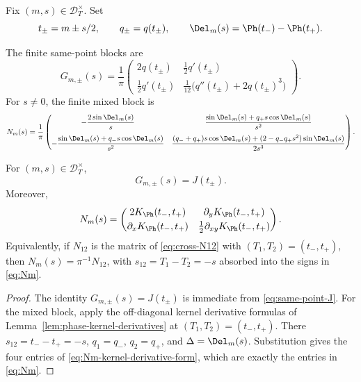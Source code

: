 Fix \((m,s)\in\mathcal D_T^\times\).  Set
\[
        t_\pm=m\pm s/2,
        \qquad q_\pm=q(t_\pm),
        \qquad \Del_m(s)=\Ph(t_-)-\Ph(t_+).
\]

\begin{definition}
\label{def:finite-same-point-and-mixed-blocks}
The finite same-point blocks are
\begin{equation}
\label{eq:Gpm}
G_{m,\pm}(s)
=\frac1\pi
\begin{pmatrix}
2q(t_\pm) & \tfrac12 q'(t_\pm)\\[0.8ex]
\tfrac12 q'(t_\pm) & \tfrac1{12}\bigl(q''(t_\pm)+2q(t_\pm)^3\bigr)
\end{pmatrix}.
\end{equation}
For \(s\ne0\), the finite mixed block is
\begin{equation}
\label{eq:Nm}
N_m(s)
=\frac1\pi
\begin{pmatrix}
-\dfrac{2\sin\Del_m(s)}{s}
&
\dfrac{\sin\Del_m(s)+q_+ s\cos\Del_m(s)}{s^2}
\\[2.4ex]
-\dfrac{\sin\Del_m(s)+q_- s\cos\Del_m(s)}{s^2}
&
\dfrac{(q_-+q_+)s\cos\Del_m(s)+(2-q_-q_+s^2)\sin\Del_m(s)}{2s^3}
\end{pmatrix}.
\end{equation}
\end{definition}

\begin{lemma}
\label{lem:finite-blocks-exact-interpretation}
For \((m,s)\in\mathcal D_T^\times\),
\[
        G_{m,\pm}(s)=J(t_\pm).
\]
Moreover,
\begin{equation}
\label{eq:Nm-kernel-derivative-form}
N_m(s)=
\begin{pmatrix}
2K_\Ph(t_-,t_+) & \partial_y K_\Ph(t_-,t_+)\\[0.6ex]
\partial_x K_\Ph(t_-,t_+) & \tfrac12\partial_{xy}K_\Ph(t_-,t_+)
\end{pmatrix}.
\end{equation}
Equivalently, if \(N_{12}\) is the matrix of \eqref{eq:cross-N12} with
\((T_1,T_2)=(t_-,t_+)\), then \(N_m(s)=\pi^{-1}N_{12}\), with
\(s_{12}=T_1-T_2=-s\) absorbed into the signs in \eqref{eq:Nm}.
\end{lemma}

\begin{proof}
The identity \(G_{m,\pm}(s)=J(t_\pm)\) is immediate from
\eqref{eq:same-point-J}.  For the mixed block, apply the off-diagonal
kernel derivative formulas of Lemma~\ref{lem:phase-kernel-derivatives}
at \((T_1,T_2)=(t_-,t_+)\).  There
\(s_{12}=t_- - t_+=-s\), \(q_1=q_-\), \(q_2=q_+\), and
\(\Delta=\Del_m(s)\).  Substitution gives the four entries of
\eqref{eq:Nm-kernel-derivative-form}, which are exactly the entries in
\eqref{eq:Nm}.
\end{proof}

